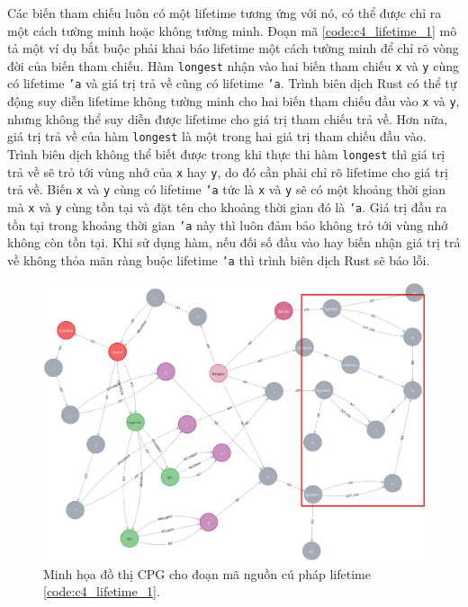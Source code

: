 Các biến tham chiếu luôn có một lifetime tương ứng với nó, có thể được chỉ ra một cách tường minh hoặc không tường minh.
Đoạn mã \ref{code:c4_lifetime_1} mô tả một ví dụ bắt buộc phải khai báo lifetime một cách tường minh để chỉ rõ vòng đời của biến tham chiếu.
Hàm \texttt{longest} nhận vào hai biến tham chiếu \texttt{x} và \texttt{y} cùng có lifetime \texttt{'a} và giá trị trả về cũng có lifetime \texttt{'a}.
Trình biên dịch Rust có thể tự động suy diễn lifetime không tường minh cho hai biến tham chiếu đầu vào \texttt{x} và \texttt{y}, nhưng không thể suy diễn được lifetime cho giá trị tham chiếu trả về.
Hơn nữa, giá trị trả về của hàm \texttt{longest} là một trong hai giá trị tham chiếu đầu vào.
Trình biên dịch không thể biết được trong khi thực thi hàm \texttt{longest} thì giá trị trả về sẽ trỏ tới vùng nhớ của \texttt{x} hay \texttt{y}, do đó cần phải chỉ rõ lifetime cho giá trị trả về.
Biến \texttt{x} và \texttt{y} cùng có lifetime \texttt{'a} tức là \texttt{x} và \texttt{y} sẽ có một khoảng thời gian mà \texttt{x} và \texttt{y} cùng tồn tại và đặt tên cho khoảng thời gian đó là \texttt{'a}.
Giá trị đầu ra tồn tại trong khoảng thời gian \texttt{'a} này thì luôn đảm bảo không trỏ tới vùng nhớ không còn tồn tại.
Khi sử dụng hàm, nếu đối số đầu vào hay biến nhận giá trị trả về không thỏa mãn ràng buộc lifetime \texttt{'a} thì trình biên dịch Rust sẽ báo lỗi.

\vspace{\baselineskip}

\begin{figure}[H]
    \includegraphics[width=1\columnwidth]{figures/c4.highlight/c4_lifetime_1_medium.png}
    \centering
    \caption{Minh họa đồ thị CPG cho đoạn mã nguồn cú pháp lifetime \ref{code:c4_lifetime_1}.}
    \label{img:c4_lifetime_1}
\end{figure}

